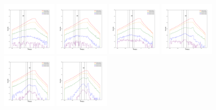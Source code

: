 \documentclass[12pt,prd]{article}
\begin{document}
\begin{figure}[h!]
\includegraphics[width=0.24\textwidth]{../figures/scanning_plotsgaiascan_l337_5_b74_4_ra201_9_dec14_0_npy_4.pdf}
\includegraphics[width=0.24\textwidth]{../figures/scanning_plotsgaiascan_l337_5_b74_4_ra201_9_dec14_0_npy_5.pdf}
\includegraphics[width=0.24\textwidth]{../figures/scanning_plotsgaiascan_l337_5_b74_4_ra201_9_dec14_0_npy_6.pdf}
\includegraphics[width=0.24\textwidth]{../figures/scanning_plotsgaiascan_l337_5_b74_4_ra201_9_dec14_0_npy_7.pdf}
\includegraphics[width=0.24\textwidth]{../figures/scanning_plotsgaiascan_l337_5_b74_4_ra201_9_dec14_0_npy_8.pdf}
\includegraphics[width=0.24\textwidth]{../figures/scanning_plotsgaiascan_l337_5_b74_4_ra201_9_dec14_0_npy_9.pdf}

\end{figure}
\end{document}
